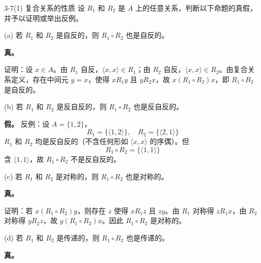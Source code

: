 \documentclass[11pt]{article}
\begin{document}

\begin{question}{3-7(1) 复合关系的性质}
  设 $R_1$ 和 $R_2$ 是 $A$ 上的任意关系，判断以下命题的真假，并予以证明或举出反例。

  \begin{subquestion}{(a) 若 $R_1$ 和 $R_2$ 是自反的，则 $R_1 \circ R_2$ 也是自反的。}
    \begin{subanswer}
      \textbf{真。}

      证明：设 $x \in A$。由 $R_1$ 自反，$\langle x,x \rangle \in R_1$；由 $R_2$ 自反，$\langle x,x \rangle \in R_2$。由复合关系定义，存在中间元 $y=x$，使得 $xR_1y$ 且 $yR_2x$，故 $x(R_1 \circ R_2)x$，即 $R_1 \circ R_2$ 是自反的。
    \end{subanswer}
  \end{subquestion}

  \begin{subquestion}{(b) 若 $R_1$ 和 $R_2$ 是反自反的，则 $R_1 \circ R_2$ 也是反自反的。}
    \begin{subanswer}
      \textbf{假。} 反例：设 $A = \{1, 2\}$，
      $$R_1 = \{\langle 1,2\rangle\}, \quad R_2 = \{\langle 2,1\rangle\}$$
      $R_1$ 和 $R_2$ 均是反自反的（不含任何形如 $\langle x,x\rangle$ 的序偶）。但
      $$R_1 \circ R_2 = \{\langle 1,1\rangle\}$$
      含 $\langle 1,1\rangle$，故 $R_1 \circ R_2$ 不是反自反的。
    \end{subanswer}
  \end{subquestion}

  \begin{subquestion}{(c) 若 $R_1$ 和 $R_2$ 是对称的，则 $R_1 \circ R_2$ 也是对称的。}
    \begin{subanswer}
      \textbf{真。}

      证明：若 $x(R_1 \circ R_2)y$，则存在 $z$ 使得 $xR_1z$ 且 $zy$。由 $R_1$ 对称得 $zR_1x$，由 $R_2$ 对称得 $yR_2z$，故 $y(R_1 \circ R_2)x$。因此 $R_1 \circ R_2$ 是对称的。
    \end{subanswer}
  \end{subquestion}

  \begin{subquestion}{(d) 若 $R_1$ 和 $R_2$ 是传递的，则 $R_1 \circ R_2$ 也是传递的。}
    \begin{subanswer}
      \textbf{真。}


\end{subanswer}
\end{subquestion}
\end{question}
\end{document}
